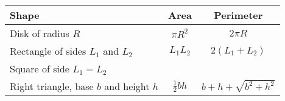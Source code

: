 \documentclass[11pt]{article}
\begin{document}
\begin{center}
	\begin{tabular}{|p{2in}|c|c|}
		Shape                                   & Area            & Perimeter            \\
		\hline\hline
		Disk of radius $R$                      & $\pi R^2$       & $2\pi R$             \\
		\hline
		Rectangle of sides $L_1$ and $L_2$      & $L_1L_2$        & $2(L_1+L_2)$         \\
		\cline{1-1}
		Square of side $L_1=L_2$                &                 &                      \\
		\hline
		Right triangle, base $b$ and height $h$ & $\frac{1}{2}bh$ & $b+h+\sqrt{b^2+h^2}$ \\
	\end{tabular}
\end{center}
\end{document}
